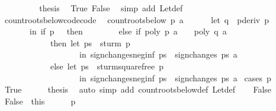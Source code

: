 \begin{isabellebody}
\ \ \ \ \ \ \isamarkupfalse%
\ \isamarkupfalse%
\ {\isacharquery}thesis\ \isamarkupfalse%
\ True\ False\ \isamarkupfalse%
\ {\isacharparenleft}simp\ add{\isacharcolon}\ Let{\isacharunderscore}def{\isacharparenright}\isanewline
\ \ \ \ \isamarkupfalse%
\isanewline
{}\isamarkupfalse%
%
\endisatagproof
{\isafoldproof}%
%
\isadelimproof
\isanewline
%
\endisadelimproof
\isanewline
{}\isamarkupfalse%
\ count{\isacharunderscore}roots{\isacharunderscore}below{\isacharunderscore}code{\isacharbrackleft}code{\isacharbrackright}{\isacharcolon}\isanewline
\ \ {\isachardoublequoteopen}count{\isacharunderscore}roots{\isacharunderscore}below\ p\ a\ {\isacharequal}\isanewline
\ \ \ \ \ {\isacharparenleft}let\ q\ {\isacharequal}\ pderiv\ p\isanewline
\ \ \ \ \ \ \ in\ if\ p\ {\isacharequal}\ {}\ then\ {}\isanewline
\ \ \ \ \ \ \ else\ if\ poly\ p\ a\ {\isasymnoteq}\ {}\ {\isasymor}\ poly\ q\ a\ {\isasymnoteq}\ {}\isanewline
\ \ \ \ \ \ \ \ \ \ \ \ then\ {\isacharparenleft}let\ ps\ {\isacharequal}\ sturm\ p\ \isanewline
\ \ \ \ \ \ \ \ \ \ \ \ \ \ \ \ \ \ \ in\ sign{\isacharunderscore}changes{\isacharunderscore}neg{\isacharunderscore}inf\ ps\ {\isacharminus}\ sign{\isacharunderscore}changes\ ps\ a{\isacharparenright}\isanewline
\ \ \ \ \ \ \ \ \ \ \ \ else\ {\isacharparenleft}let\ ps\ {\isacharequal}\ sturm{\isacharunderscore}squarefree\ p\isanewline
\ \ \ \ \ \ \ \ \ \ \ \ \ \ \ \ \ \ \ in\ sign{\isacharunderscore}changes{\isacharunderscore}neg{\isacharunderscore}inf\ ps\ {\isacharminus}\ sign{\isacharunderscore}changes\ ps\ a{\isacharparenright}{\isacharparenright}{\isachardoublequoteclose}\isanewline
%
\isadelimproof
%
\endisadelimproof
%
\isatagproof
{}\isamarkupfalse%
\ {\isacharparenleft}cases\ {\isachardoublequoteopen}p\ {\isacharequal}\ {}{\isachardoublequoteclose}{\isacharparenright}\isanewline
\ \ \isamarkupfalse%
\ True\isanewline
\ \ \ \ \isamarkupfalse%
\ {\isacharquery}thesis\ \isamarkupfalse%
\ {\isacharparenleft}auto\ simp\ add{\isacharcolon}\ count{\isacharunderscore}roots{\isacharunderscore}below{\isacharunderscore}def\ Let{\isacharunderscore}def{\isacharparenright}\isanewline
{}\isamarkupfalse%
\isanewline
\ \ \isamarkupfalse%
\ False\isanewline
\ \ \ \ \isamarkupfalse%
\ False{}\ {\isacharequal}\ this\isanewline
\ \ \ \ \isamarkupfalse%
\ {\isachardoublequoteopen}p\ {\isasymnoteq}\ {}{\isachardoublequoteclose}\ \isamarkupfalse%

\end{isabellebody}
